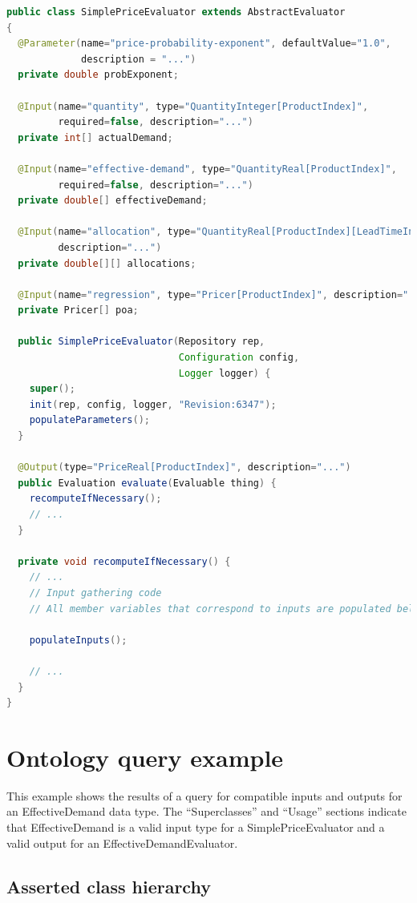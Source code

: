 \documentclass{article}
\begin{document}
{\small
\begin{lstlisting}[language={Java}]
public class SimplePriceEvaluator extends AbstractEvaluator
{
  @Parameter(name="price-probability-exponent", defaultValue="1.0",
             description = "...")
  private double probExponent;

  @Input(name="quantity", type="QuantityInteger[ProductIndex]",
         required=false, description="...")
  private int[] actualDemand;

  @Input(name="effective-demand", type="QuantityReal[ProductIndex]",
         required=false, description="...")
  private double[] effectiveDemand;

  @Input(name="allocation", type="QuantityReal[ProductIndex][LeadTimeInteger]",
         description="...")
  private double[][] allocations;

  @Input(name="regression", type="Pricer[ProductIndex]", description="...")
  private Pricer[] poa;

  public SimplePriceEvaluator(Repository rep,
                              Configuration config,
                              Logger logger) {
    super();
    init(rep, config, logger, "Revision:6347");
    populateParameters();
  }

  @Output(type="PriceReal[ProductIndex]", description="...")
  public Evaluation evaluate(Evaluable thing) {
    recomputeIfNecessary();
    // ...
  }

  private void recomputeIfNecessary() {
    // ...
    // Input gathering code
    // All member variables that correspond to inputs are populated below.

    populateInputs();

    // ...
  }
}
\end{lstlisting}
}

\clearpage
\section{Ontology query example}
\label{sec:ontology-query}

This example shows the results of a query for compatible inputs and outputs for an EffectiveDemand data type.
The ``Superclasses'' and ``Usage'' sections indicate that EffectiveDemand is a valid input type for a SimplePriceEvaluator and a valid output for an EffectiveDemandEvaluator.

\subsection*{Asserted class hierarchy}
\end{document}
